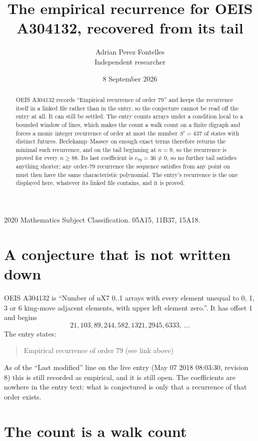 \documentclass[11pt,a4paper]{article}
\title{The empirical recurrence for OEIS A304132, recovered from its tail}
\author{Adrian Perez Fontelles\\ \small Independent researcher}
\date{8 September 2026}
\theoremstyle{plain}
\theoremstyle{definition}
\begin{document}
\maketitle

\begin{abstract}
OEIS A304132 records ``Empirical recurrence of order $79$'' and keeps the recurrence itself in
a linked file rather than in the entry, so the conjecture cannot be read off the entry at all.
It can still be settled. The entry counts arrays under a condition local to a bounded window of
lines, which makes the count a walk count on a finite digraph and forces a monic integer
recurrence of order at most the number $S'=437$ of states with distinct futures. Berlekamp--Massey on
enough exact terms therefore returns the minimal such recurrence, and on the tail beginning at $n=9$, so the recurrence is proved for every $n\ge88$.
Its last coefficient is $c_{79}=36\neq0$, so no further tail satisfies anything
shorter; any order-$79$ recurrence the sequence satisfies from any point on must then have
the same characteristic polynomial. The entry's recurrence is the one displayed here, whatever
its linked file contains, and it is proved.
\end{abstract}

\noindent\small 2020 Mathematics Subject Classification. 05A15, 11B37, 15A18.\normalsize

\section{A conjecture that is not written down}

OEIS A304132 is ``Number of nX7 0..1 arrays with every element unequal to 0, 1, 3 or 6 king-move adjacent elements, with upper left element zero.''. It has offset $1$ and begins
\[
21, 103, 89, 244, 582, 1321, 2945, 6333,\ \dots
\]
The entry states:
\begin{quote}
Empirical recurrence of order 79 (see link above)
\end{quote}
As of the ``Last modified'' line on the live entry (May 07 2018 08:03:30, revision 8)
this is still recorded as empirical, and it is still open. The coefficients are nowhere in the
entry text: what is conjectured is only that a recurrence of that order exists.

\section{The count is a walk count}
\end{document}
